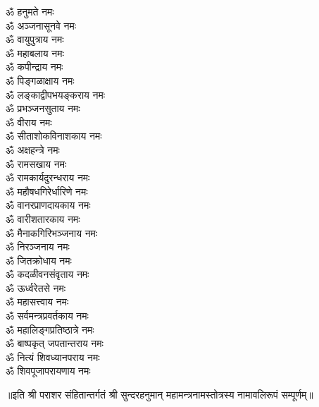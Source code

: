 \begin{multicols}{2}
\begin{flushleft}
ॐ हनुमते नमः\\
ॐ अञ्जनासूनवे नमः\\
ॐ वायुपुत्राय नमः\\
ॐ महाबलाय नमः\\
ॐ कपीन्द्राय नमः\\
ॐ पिङ्गळाक्षाय नमः\\
ॐ लङ्काद्वीपभयङ्कराय नमः\\
ॐ प्रभञ्जनसुताय नमः\\
ॐ वीराय नमः\\
ॐ सीताशोकविनाशकाय नमः\hfill{}\\
ॐ अक्षहन्त्रे नमः\\
ॐ रामसखाय नमः\\
ॐ रामकार्यदुरन्धराय नमः\\
ॐ महौषधगिरेर्धारिणे नमः\\
ॐ वानरप्राणदायकाय नमः\\
ॐ वारीशतारकाय नमः\\
ॐ मैनाकगिरिभञ्जनाय नमः\\
ॐ निरञ्जनाय नमः\\
ॐ जितक्रोधाय नमः\\
ॐ कदळीवनसंवृताय नमः\hfill{}\\
ॐ ऊर्ध्वरेतसे नमः\\
ॐ महासत्त्वाय नमः\\
ॐ सर्वमन्त्रप्रवर्तकाय नमः\\
ॐ महालिङ्गप्रतिष्ठात्रे नमः\\
ॐ बाष्पकृत् जपतान्तराय नमः\\
ॐ नित्यं शिवध्यानपराय नमः\\
ॐ शिवपूजापरायणाय नमः\hfill{}\\
\end{flushleft}
\end{multicols}
\centerline{॥इति श्री पराशर संहितान्तर्गतं श्री सुन्दरहनुमान् महामन्त्रनामस्तोत्रस्य नामावलिरूपं सम्पूर्णम्॥}
